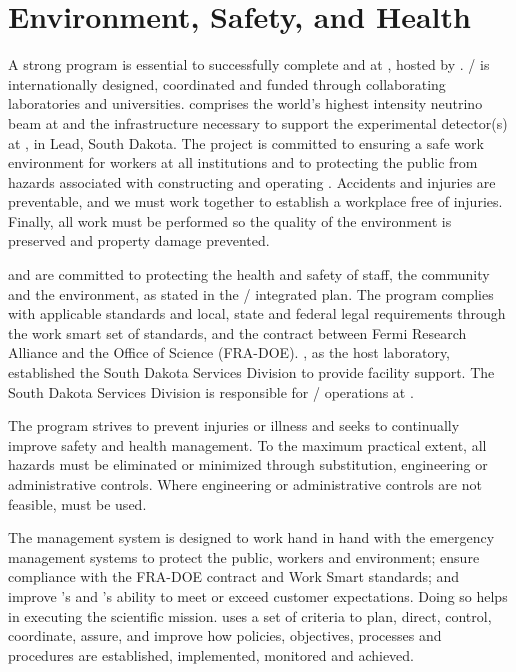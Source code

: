 \chapter{Environment, Safety, and Health}
\label{vl:tc-ESH}


A strong  program is essential to successfully complete
 and  at \surf, hosted by
\fnal.  / is internationally designed,
coordinated and funded through collaborating laboratories and
universities.   comprises the
world's highest intensity neutrino beam at \fnal and the
infrastructure necessary to support the experimental detector(s) at
\surf, in Lead, South Dakota. The  project is committed to ensuring a
safe work environment for  workers at all
institutions and to protecting the public from hazards associated with
constructing and operating .  Accidents and
injuries are preventable, and we must work together to
establish a workplace free of injuries.  Finally, all work must be
performed so the quality of the environment is preserved
and property damage prevented.

\fnal and  are committed to protecting the health and
safety of staff, the community and the environment, as stated in the
/ integrated  plan.  The
 program complies with applicable standards and local,
state and federal legal requirements through the \fnal work smart set
of standards, and the contract between Fermi Research Alliance and the
 Office of Science (FRA-DOE). \fnal, as the host
laboratory, established the South Dakota Services Division to provide
facility support.  The South Dakota Services Division is responsible
for / operations at \surf.

The \fnal {} program strives to prevent injuries or illness and seeks to
continually improve safety and health management.  To the maximum
practical extent, all hazards must be eliminated or minimized through
substitution, engineering or administrative controls.  Where
engineering or administrative controls are not feasible, 
must be used.

The  management system is designed to work hand in hand
with the \surf emergency management systems to protect the public,
workers and environment; ensure compliance with the FRA-DOE contract
and \fnal Work Smart standards; and improve \fnal's and 's
ability to meet or exceed customer expectations. Doing so helps in
executing the scientific mission.  \fnal uses a set of criteria to
plan, direct, control, coordinate, assure, and improve how 
policies, objectives, processes and procedures are established,
implemented, monitored and achieved.

